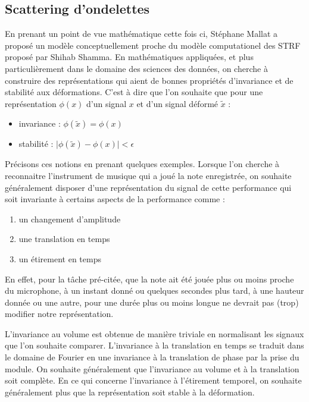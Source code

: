 \subsection{Scattering d'ondelettes}

En prenant un point de vue mathématique cette fois ci, Stéphane Mallat a proposé un modèle conceptuellement proche du modèle computationel des STRF proposé par Shihab Shamma. En mathématiques appliquées, et plus particulièrement dans le domaine des sciences des données, on cherche à construire des représentations qui aient de bonnes propriétés d'invariance et de stabilité aux déformations. C'est à dire que l'on souhaite que pour une représentation $\phi(x)$ d'un signal $x$ et d'un signal déformé $\tilde x$ :
\begin{itemize}
  \item invariance : $\phi(\tilde x) = \phi(x)$
  \item stabilité : $ \vert \phi(\tilde x) - \phi(x) | < \epsilon $
\end{itemize}

Précisons ces notions en prenant quelques exemples. Lorsque l'on cherche à reconnaitre l'instrument de musique qui a joué la note enregistrée, on souhaite généralement disposer d'une représentation du signal de cette performance qui soit invariante à certains aspects de la performance comme :
\begin{enumerate}
  \item un changement d'amplitude
  \item une translation en temps
  \item un étirement en temps
\end{enumerate}
En effet, pour la tâche pré-citée, que la note ait été jouée plus ou moins proche du microphone, à un instant donné ou quelques secondes plus tard, à une hauteur donnée ou une autre, pour une durée plus ou moins longue ne devrait pas (trop) modifier notre représentation.

L'invariance au volume est obtenue de manière triviale en normalisant les signaux que l'on souhaite comparer. L'invariance à la translation en temps se traduit dans le domaine de Fourier en une invariance à la translation de phase par la prise du module. On souhaite généralement que l'invariance au volume et à la translation soit complète. En ce qui concerne l'invariance à l'étirement temporel, on souhaite généralement plus que la représentation soit stable à la déformation.

